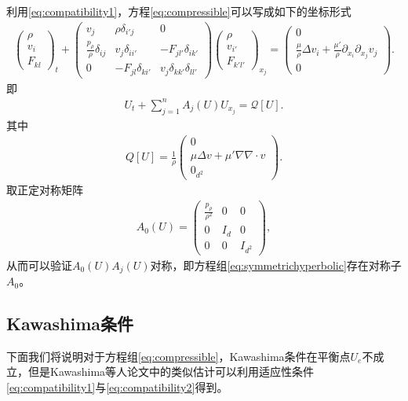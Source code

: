利用\eqref{eq:compatibility1}，方程\eqref{eq:compressible}可以写成如下的坐标形式
\begin{eqnarray*}
  \left( \begin{array}{c} \rho \\ v_i \\ F_{kl} \end{array} \right)_t
  +
  \left( \begin{array}{ccc} v_j & \rho \delta_{i'j} & 0 \\
    \frac{p_\rho}{\rho} \delta_{ij} & v_j \delta_{ii'} & -F_{jl'} \delta_{ik'} \\
    0 & - F_{jl}\delta_{ki'}  & v_j \delta_{kk'} \delta_{ll'} \end{array} \right)
  \left( \begin{array}{c} \rho \\ v_{i'} \\ F_{k'l'} \end{array} \right)_{x_j}
=
\left( \begin{array}{c} 0 \\ \frac{\mu}{\rho} \Delta {v_i} + \frac{\mu'}{\rho} \partial_{x_i} \partial_{x_j} v_j  \\ 0 \end{array} \right).
\end{eqnarray*}
即
\begin{eqnarray}\label{eq:symmetrichyperbolic}
  U_t + \sum_{j=1}^n A_j(U) U_{x_j} = \mathcal{Q}[U].
\end{eqnarray}
其中
\begin{eqnarray*}
  Q[U] = \frac{1}{\rho}\left( \begin{array}{c} 0\\ \mu\Delta  v + \mu'\nabla \nabla \cdot  v  \\ 0_{d^2} \end{array} \right).
\end{eqnarray*}
取正定对称矩阵
\begin{eqnarray}
  A_0(U) = \left( \begin{array}{ccc} \frac{p_\rho}{\rho^2} & 0 & 0 \\
                                                   0 & I_d & 0 \\
						   0 & 0 & I_{d^2}\end{array} \right),
\end{eqnarray}
从而可以验证$A_0(U) A_j(U)$对称，即方程组\eqref{eq:symmetrichyperbolic}存在对称子$A_0$。

\subsection{Kawashima条件}
下面我们将说明对于方程组\eqref{eq:compressible}，Kawashima条件在平衡点$U_e$不成立，但是Kawashima等人论文\cite{shizuta1985systems,kawashima1984systems}中的类似估计可以利用适应性条件\eqref{eq:compatibility1}与\eqref{eq:compatibility2}得到。

